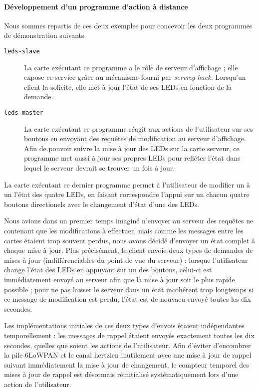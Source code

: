 \paragraph{Développement d’un programme d’action à distance}

Nous sommes repartis de ces deux exemples pour concevoir les deux programmes de démonstration suivants.

\begin{description}
	\item[\texttt{leds-slave}]
		La carte exécutant ce programme a le rôle de serveur d’affichage ; elle expose ce service grâce au mécanisme fourni par \emph{servreg-hack}.
		Lorsqu’un client la solicite, elle met à jour l’état de ses LEDs en fonction de la demande.
	\item[\texttt{leds-master}]
		La carte exécutant ce programme réagit aux actions de l’utilisateur sur ses boutons en envoyant des requêtes de modification au serveur d’affichage.
		Afin de pouvoir suivre la mise à jour des LEDs sur la carte serveur, ce programme met aussi à jour ses propres LEDs pour refléter l’état dans lequel le serveur devrait se trouver un fois à jour.
\end{description}

La carte exécutant ce dernier programme permet à l’utilisateur de modifier un à un l’état des quatre LEDs, en faisant correspondre l’appui sur un chacun quatre boutons directionels avec le changement d’état d’une des LEDs.

Nous avions dans un premier temps imaginé n’envoyer au serveur des requêtes ne contenant que les modifications à effectuer, mais comme les messages entre les cartes étaient trop souvent perdus, nous avons décidé d’envoyer un état complet à chaque mise à jour.
Plus précisément, le client envoie deux types de demandes de mises à jour (indifférenciables du point de vue du serveur) : lorsque l’utilisateur change l’état des LEDs en appuyant sur un des boutons, celui-ci est immédiatement envoyé au serveur afin que la mise à jour soit le plus rapide possible ; pour ne pas laisser le serveur dans un état incohérent trop longtemps si ce message de modification est perdu, l’état est de nouvaeu envoyé toutes les dix secondes.

Les implémentations initiales de ces deux types d’envois étaient indépendantes temporellement : les messages de rappel étaient envoyés exactement toutes les dix secondes, quelles que soient les actions de l’utilisateur.
Afin d’éviter d’encombrer la pile 6LoWPAN et le canal hertzien inutilement avec une mise à jour de rappel suivant immédiatement la mise à jour de changement, le compteur temporel des mises à jour de rappel est désormais réinitialisé systématiquement lors d’une action de l’utilisateur.
